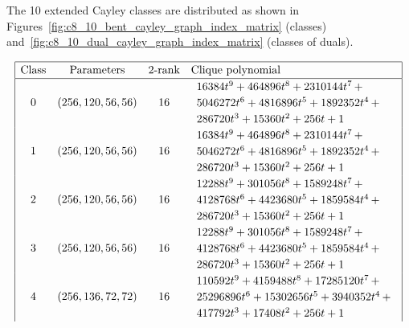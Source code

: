 \documentclass[12pt,a4paper]{article}
\begin{document}
The 10 extended Cayley classes are distributed
as shown in Figures~\ref{fig:c8_10_bent_cayley_graph_index_matrix} (classes) and~\ref{fig:c8_10_dual_cayley_graph_index_matrix}
(classes of duals).
\begin{table}[!bhpt] %
\small{}
\begin{align*}
\def\arraystretch{1.2}
\begin{array}{|cccl|}
\hline
\text{Class} &
\text{Parameters} &
\text{2-rank} &
\text{Clique polynomial}
\\
\hline
0 &
(256, 120, 56, 56) &
16 &
\begin{array}{l}
16384t^{9} + 464896t^{8} + 2310144t^{7}
\,+
\\
 5046272t^{6} + 4816896t^{5} + 1892352t^{4}
\,+
\\
 286720t^{3} + 15360t^{2} + 256t + 1
\end{array}
\\
1 &
(256, 120, 56, 56) &
16 &
\begin{array}{l}
16384t^{9} + 464896t^{8} + 2310144t^{7}
\,+
\\
 5046272t^{6} + 4816896t^{5} + 1892352t^{4}
\,+
\\
 286720t^{3} + 15360t^{2} + 256t + 1
\end{array}
\\
2 &
(256, 120, 56, 56) &
16 &
\begin{array}{l}
12288t^{9} + 301056t^{8} + 1589248t^{7}
\,+
\\
 4128768t^{6} + 4423680t^{5} + 1859584t^{4}
\,+
\\
 286720t^{3} + 15360t^{2} + 256t + 1
\end{array}
\\
3 &
(256, 120, 56, 56) &
16 &
\begin{array}{l}
12288t^{9} + 301056t^{8} + 1589248t^{7}
\,+
\\
 4128768t^{6} + 4423680t^{5} + 1859584t^{4}
\,+
\\
 286720t^{3} + 15360t^{2} + 256t + 1
\end{array}
\\
4 &
(256, 136, 72, 72) &
16 &
\begin{array}{l}
110592t^{9} + 4159488t^{8} + 17285120t^{7}
\,+
\\
 25296896t^{6} + 15302656t^{5} + 3940352t^{4}
\,+
\\
 417792t^{3} + 17408t^{2} + 256t + 1
\end{array}
\\

\end{array}
\end{align*}
\end{table}
\end{document}
